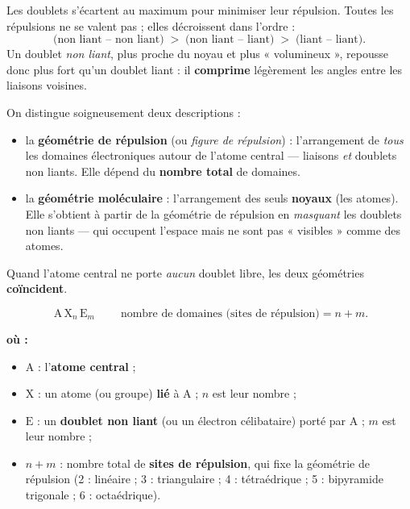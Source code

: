 \documentclass[11pt,a4paper]{article}
\newenvironment{ou}{%
  \par\smallskip\noindent\textbf{où :}\nopagebreak
  \begin{itemize}[leftmargin=1.8em,topsep=2pt,itemsep=1.5pt,parsep=0pt]}%
  {\end{itemize}}
\newcommand{\AX}[2]{\ensuremath{\mathrm{AX_{#1}E_{#2}}}}
\begin{document}
\begin{theoreme}
Les doublets s'écartent au maximum pour minimiser leur répulsion. Toutes les répulsions ne se
valent pas ; elles décroissent dans l'ordre :
\[ \text{(non liant -- non liant)} \;>\; \text{(non liant -- liant)} \;>\; \text{(liant -- liant)}. \]
Un doublet \emph{non liant}, plus proche du noyau et plus « volumineux », repousse donc plus fort
qu'un doublet liant : il \textbf{comprime} légèrement les angles entre les liaisons voisines.
\end{theoreme}

\begin{definition}
On distingue soigneusement deux descriptions :
\begin{itemize}[leftmargin=1.6em,topsep=2pt,itemsep=3pt]
  \item la \textbf{géométrie de répulsion} (ou \emph{figure de répulsion}) : l'arrangement de
        \emph{tous} les domaines électroniques autour de l'atome central — liaisons \emph{et}
        doublets non liants. Elle dépend du \textbf{nombre total} de domaines.
  \item la \textbf{géométrie moléculaire} : l'arrangement des seuls \textbf{noyaux} (les atomes).
        Elle s'obtient à partir de la géométrie de répulsion en \emph{masquant} les doublets non
        liants — qui occupent l'espace mais ne sont pas « visibles » comme des atomes.
\end{itemize}
Quand l'atome central ne porte \emph{aucun} doublet libre, les deux géométries
\textbf{coïncident}.
\end{definition}

\begin{formule}[notation \AX{n}{m}]
\[ \boxed{\;\mathrm{A}\,\mathrm{X}_n\,\mathrm{E}_m\;}\qquad
   \text{nombre de domaines (sites de répulsion)} = n + m. \]
\begin{ou}
  \item $\mathrm{A}$ : l'\textbf{atome central} ;
  \item $\mathrm{X}$ : un atome (ou groupe) \textbf{lié} à $\mathrm{A}$ ; $n$ est leur nombre ;
  \item $\mathrm{E}$ : un \textbf{doublet non liant} (ou un électron célibataire) porté par
        $\mathrm{A}$ ; $m$ est leur nombre ;
  \item $n+m$ : nombre total de \textbf{sites de répulsion}, qui fixe la géométrie de répulsion
        (2 : linéaire ; 3 : triangulaire ; 4 : tétraédrique ; 5 : bipyramide trigonale ;
        6 : octaédrique).
\end{ou}
\end{formule}
\end{document}
